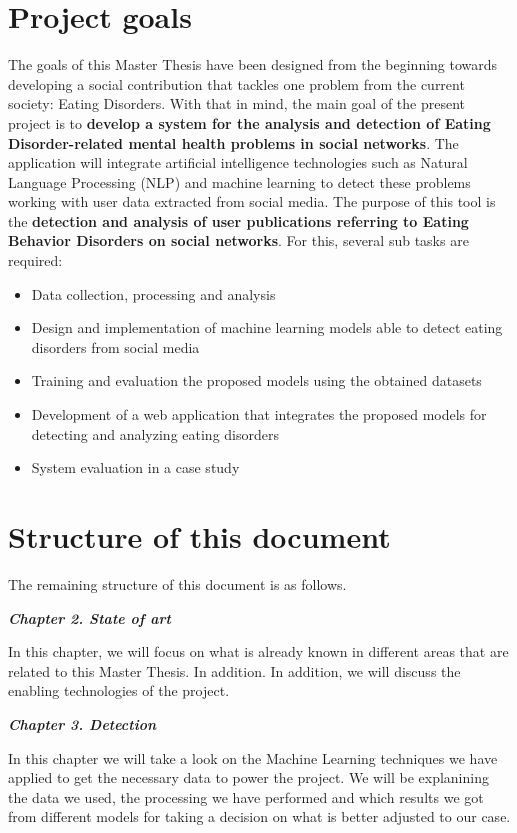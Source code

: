 \section{Project goals}
\label{sec:goals}
The goals of this Master Thesis have been designed from the beginning towards developing a social contribution that tackles one problem from the current society: Eating Disorders. With that in mind, the main goal of the present project is to \textbf{develop a system for the analysis and detection of Eating Disorder-related mental health problems in social networks}. The application will integrate artificial intelligence technologies such as Natural Language Processing (NLP) and machine learning to detect these problems working with user data extracted from social media. The purpose of this tool is the \textbf{detection and analysis of user publications referring to Eating Behavior Disorders on social networks}. For this, several sub tasks are required:

\begin{itemize}
    \item Data collection, processing and analysis
    \item Design and implementation of machine learning models able to detect eating disorders from social media
    \item Training and evaluation the proposed models using the obtained datasets
    \item Development of a web application that integrates the proposed models for detecting and analyzing eating disorders
    \item System evaluation in a case study
\end{itemize}


\section{Structure of this document}

The remaining structure of this document is as follows.

\textbf{\textit{Chapter 2. State of art}}

In this chapter, we will focus on what is already known in different areas that are related to this Master Thesis. In addition. In addition, we will discuss the enabling technologies of
the project.

\textbf{\textit{Chapter 3. Detection}} 

In this chapter we will take a look on the Machine Learning techniques we have applied to get the necessary data to power the project. We will be explanining the data we used, the processing we have performed and which results we got from different models for taking a decision on what is better adjusted to our case.


